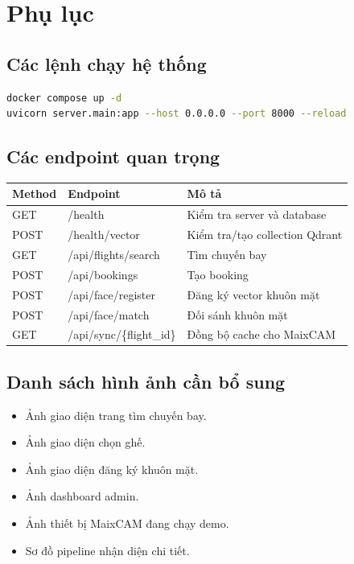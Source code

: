 \section{Phụ lục}

\subsection{Các lệnh chạy hệ thống}
\begin{lstlisting}[language=bash]
docker compose up -d
uvicorn server.main:app --host 0.0.0.0 --port 8000 --reload
\end{lstlisting}

\subsection{Các endpoint quan trọng}
\begin{longtable}{p{}p{}p{}}
\toprule
\textbf{Method} & \textbf{Endpoint} & \textbf{Mô tả} \\
\midrule
GET & /health & Kiểm tra server và database \\
POST & /health/vector & Kiểm tra/tạo collection Qdrant \\
GET & /api/flights/search & Tìm chuyến bay \\
POST & /api/bookings & Tạo booking \\
POST & /api/face/register & Đăng ký vector khuôn mặt \\
POST & /api/face/match & Đối sánh khuôn mặt \\
GET & /api/sync/\{flight\_id\} & Đồng bộ cache cho MaixCAM \\
\bottomrule
\end{longtable}

\subsection{Danh sách hình ảnh cần bổ sung}
\begin{itemize}
  \item Ảnh giao diện trang tìm chuyến bay.
  \item Ảnh giao diện chọn ghế.
  \item Ảnh giao diện đăng ký khuôn mặt.
  \item Ảnh dashboard admin.
  \item Ảnh thiết bị MaixCAM đang chạy demo.
  \item Sơ đồ pipeline nhận diện chi tiết.
\end{itemize}

